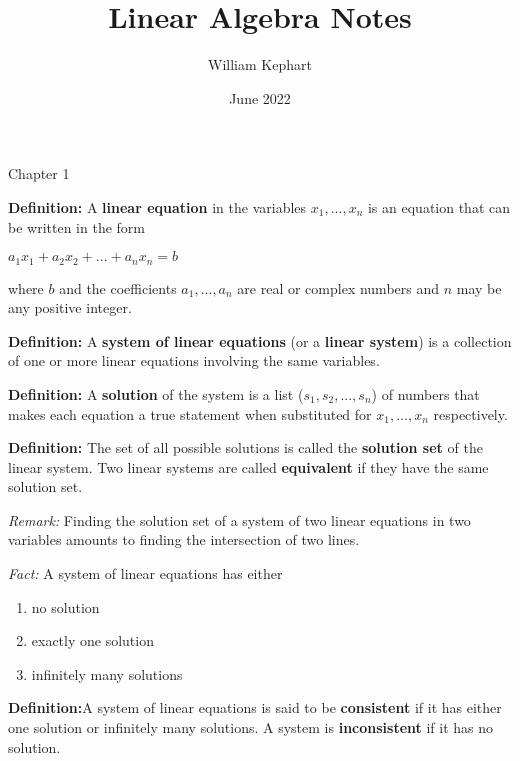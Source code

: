 \documentclass[12pt]{article}
\title{Linear Algebra Notes}
\author{William Kephart}
\date{June 2022}
\begin{document}
\maketitle
\begin{center}
    Chapter 1
\end{center}
\noindent\textbf{Definition:} A \textbf{linear equation} in the variables $x_1,...,x_n$ is an equation that can be written
in the form \begin{center}
$a_1x_1 + a_2x_2 + ... + a_nx_n = b$
\end{center}
where $b$ and the coefficients $a_1,...,a_n$ are real or complex numbers and $n$ may be any positive integer.\vspace{\baselineskip}

\noindent\textbf{Definition:} A \textbf{system of linear equations} (or a \textbf{linear system}) is a collection of one or more linear equations involving the same variables.\vspace{\baselineskip}

\noindent\textbf{Definition:} A \textbf{solution} of the system is a list ($s_1,s_2,...,s_n$) of numbers that makes each equation a true statement when substituted for $x_1,...,x_n$ respectively.\vspace{\baselineskip}

\noindent\textbf{Definition:} The set of all possible solutions is called the \textbf{solution set} of the linear system. Two linear systems are called \textbf{equivalent} if they have the same solution set.\vspace{\baselineskip}

\textit{Remark:} Finding the solution set of a system of two linear equations in two variables amounts to finding the intersection of two lines.\vspace{\baselineskip}

\noindent\textit{Fact:} A system of linear equations has either \begin{enumerate}
    \item no solution
    \item exactly one solution
    \item infinitely many solutions
\end{enumerate}
\textbf{Definition:}A system of linear equations is said to be \textbf{consistent} if it has either one solution or infinitely many solutions. A system is \textbf{inconsistent} if it has no solution.\vspace{\baselineskip}
\end{document}
